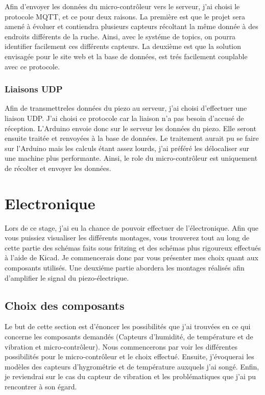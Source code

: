 \documentclass[12pt,french,a4paper]{article}
\begin{document}
Afin d'envoyer les données du micro-contrôleur vers le serveur, j'ai choisi le protocole MQTT, et ce pour deux raisons. La première est que le projet sera amené à évoluer et contiendra plusieurs capteurs récoltant la même donnée à des endroits différents de la ruche. Ainsi, avec le systéme de topics, on pourra identifier facilement ces différents capteurs. La deuxième est que la solution envisagée pour le site web et la base de données, est trés facilement couplable avec ce protocole. 

\subsubsection{Liaisons UDP}
Afin de transmettreles données du piezo au serveur, j'ai choisi d'effectuer une liaison UDP. J'ai choisi ce protocole car la liaison n'a pas besoin d'accusé de réception. L'Arduino envoie donc sur le serveur les données du piezo.
Elle seront ensuite traitée et renvoyées à la base de données. 
Le traitement aurait pu se faire sur l'Arduino mais les calculs étant assez lourds, j'ai préféré les délocaliser sur une machine plus performante. Ainsi, le role du micro-contrôleur est uniquement de récolter et envoyer les données. 

\newpage
\section{Electronique}
Lors de ce stage, j'ai eu la chance de pouvoir effectuer de l'électronique. Afin que vous puissiez visualiser les différents montages, vous trouverez tout au long de cette partie des schémas faits sous fritzing et des schémas plus rigoureux effectués à l'aide de Kicad. Je commencerais donc par vous présenter mes choix quant aux composants utilisés. Une deuxiéme partie abordera les montages réalisés afin d'amplifier le signal du piezo-électrique.
\subsection{Choix des composants}

Le but de cette section est d'énoncer les possibilités que j'ai trouvées en ce qui concerne les composants demandés (Capteurs d'humidité, de température et de vibration et micro-contrôleur). Nous commencerons par voir les différentes possibilités pour le micro-contrôleur et le choix effectué. Ensuite, j'évoquerai les modèles des capteurs d'hygrométrie et de température auxquels j'ai songé. Enfin, je reviendrai sur le cas du capteur de vibration et les problématiques que j'ai pu rencontrer à son égard.
\end{document}
